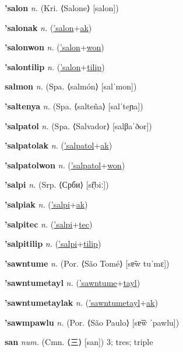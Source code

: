 \textbf{\hypertarget{'salon}{'salon}} \textit{n.} (Kri. ⟨Salone⟩ [salon])


\textbf{\hypertarget{'salonak}{'salonak}} \textit{n.} (\hyperlink{'salon}{'salon}+\allowbreak \hyperlink{ak}{ak})


\textbf{\hypertarget{'salonwon}{'salonwon}} \textit{n.} (\hyperlink{'salon}{'salon}+\allowbreak \hyperlink{won}{won})


\textbf{\hypertarget{'salontilip}{'salontilip}} \textit{n.} (\hyperlink{'salon}{'salon}+\allowbreak \hyperlink{tilip}{tilip})


\textbf{\hypertarget{salmon}{salmon}} \textit{n.} (Spa. ⟨salmón⟩ [salˈmon])


\textbf{\hypertarget{'saltenya}{'saltenya}} \textit{n.} (Spa. ⟨salteña⟩ [salˈteɲa])


\textbf{\hypertarget{'salpatol}{'salpatol}} \textit{n.} (Spa. ⟨Salvador⟩ [salβaˈðor])


\textbf{\hypertarget{'salpatolak}{'salpatolak}} \textit{n.} (\hyperlink{'salpatol}{'salpatol}+\allowbreak \hyperlink{ak}{ak})


\textbf{\hypertarget{'salpatolwon}{'salpatolwon}} \textit{n.} (\hyperlink{'salpatol}{'salpatol}+\allowbreak \hyperlink{won}{won})


\textbf{\hypertarget{'salpi}{'salpi}} \textit{n.} (Srp. ⟨Срби⟩ [sr̩̂biː])


\textbf{\hypertarget{'salpiak}{'salpiak}} \textit{n.} (\hyperlink{'salpi}{'salpi}+\allowbreak \hyperlink{ak}{ak})


\textbf{\hypertarget{'salpitec}{'salpitec}} \textit{n.} (\hyperlink{'salpi}{'salpi}+\allowbreak \hyperlink{tec}{tec})


\textbf{\hypertarget{'salpitilip}{'salpitilip}} \textit{n.} (\hyperlink{'salpi}{'salpi}+\allowbreak \hyperlink{tilip}{tilip})


\textbf{\hypertarget{'sawntume}{'sawntume}} \textit{n.} (Por. ⟨São Tomé⟩ [sɐ̃w tuˈmɛ])


\textbf{\hypertarget{'sawntumetayl}{'sawntumetayl}} \textit{n.} (\hyperlink{'sawntume}{'sawntume}+\allowbreak \hyperlink{tayl}{tayl})


\textbf{\hypertarget{'sawntumetaylak}{'sawntumetaylak}} \textit{n.} (\hyperlink{'sawntumetayl}{'sawntumetayl}+\allowbreak \hyperlink{ak}{ak})


\textbf{\hypertarget{'sawmpawlu}{'sawmpawlu}} \textit{n.} (Por. ⟨São Paulo⟩ [sɐ̃w̃ ˈpawlu])


\textbf{\hypertarget{san}{san}} \textit{num.} (Cmn. ⟨{\chinese{}三}⟩ [san])
3; tres; triple

